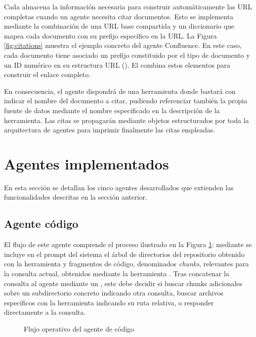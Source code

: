 Cada  almacena la información necesaria para construir automáticamente las URL completas cuando un agente necesita citar documentos. Esto se implementa mediante la combinación de una URL base compartida y un diccionario que mapea cada documento con su prefijo específico en la URL. La Figura \ref{fig:citations} muestra el ejemplo concreto del agente Confluence. En este caso, cada documento tiene asociado un prefijo constituido por el tipo de documento y un ID numérico en su estructura URL (). El  combina estos elementos para construir el enlace completo.

En consecuencia, el agente dispondrá de una herramienta donde bastará con indicar el nombre del documento a citar, pudiendo referenciar también la propia fuente de datos mediante el nombre especificado en la descripción de la herramienta. Las citas se propagarán mediante objetos estructurados por toda la arquitectura de agentes para imprimir finalmente las citas empleadas.

\section{Agentes implementados}
En esta sección se detallan los cinco agentes desarrollados que extienden las funcionalidades descritas en la sección anterior.

\subsection{Agente código}
El flujo de este agente comprende el proceso ilustrado en la Figura \ref{fig:agente_codigo}: mediante  se incluye en el prompt del sistema el árbol de directorios del repositorio obtenido con la herramienta  y fragmentos de código, denominados \textit{chunks}, relevantes para la consulta actual, obtenidos mediante la herramienta . Tras concatenar la consulta al agente mediante un , este debe decidir si buscar chunks adicionales sobre un subdirectorio concreto indicando otra consulta, buscar archivos específicos con la herramienta  indicando su ruta relativa, o responder directamente a la consulta.

\begin{figure}[h]
\centering
{}
\caption{Flujo operativo del agente de código}
\label{fig:agente_codigo}
\end{figure}

